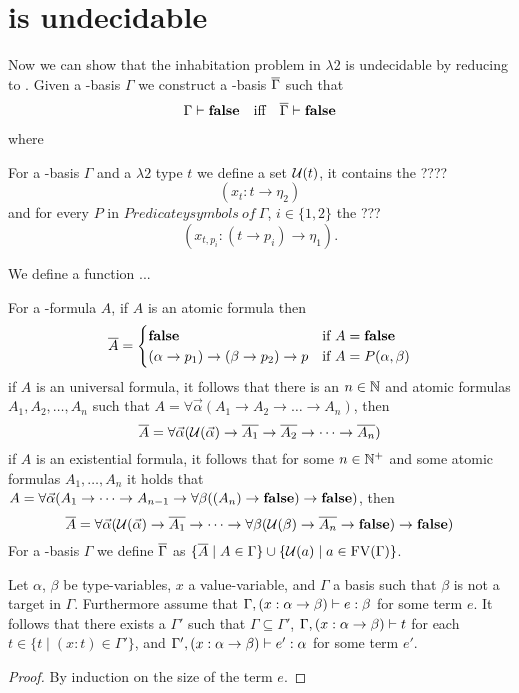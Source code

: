 \section{\lambdaInhab{} is undecidable}
Now we can show that the inhabitation problem in $\lambda2$ %
is undecidable by reducing \PCons{} to \lambdaInhab{}. Given a \SysP-basis $\Gamma$ we construct a \lambdaTwo-basis $\overline{\Gamma}$ such that 
\begin{align*}
\Gamma\vdash\textbf{false}&&\text{iff}&&\overline{\Gamma}\vdash\textbf{false}
\end{align*}
where \false{} 

\begin{definition}
For a \SysP-basis $\Gamma$ and a $\lambda2$ type $t$ we define a set $\mathcal{U}(t)$, it contains the ???? \[(x_t:t\to\eta_2)\] and for every $P$ in $Predicateysymbols~of~\Gamma$, $i\in\{1,2\}$ the ??? \[(x_{t,p_i}:(t\to p_i)\to\eta_1).\]
\end{definition}

\begin{definition}
We define a function ...

For a \SysP-formula $A$, if $A$ is an atomic formula then
\[
\trans{A}=
\begin{cases}
\false &\text{if $A=\false$}\\
(\alpha\to p_1)\to(\beta\to p_2)\to p &\text{if $A=P(\alpha,\beta)$} %
\end{cases}
\]
if $A$ is an universal formula, it follows that there is an $n\in\mathbb{N}$ and atomic formulas $A_1,A_2,\dots,A_n$ such that $A=\forall\vec{\alpha}(A_1\to A_2 \to\dots\to A_n)$, then %
\[\overline{A}=\forall\vec{\alpha}(\mathcal{U}(\vec{\alpha})\to \overline{A_1}\to \overline{A_2} \to\dots\to\overline{ A_n})\]
if $A$ is an existential formula, it follows that for some $n\in\mathbb{N}^+$ and some atomic formulas $A_1,\dots,A_n$ it holds that $A=\forall\vec{\alpha}(A_1 \to\dots\to A_{n-1}\to \forall\beta((A_n)\to\textbf{false})\to\textbf{false})$, then %
\[\overline{A}=\forall\vec{\alpha}(\mathcal{U}(\vec{\alpha})\to \overline{A_1}\to\dots\to\forall\beta(\mathcal{U}(\beta)\to\overline{ A_n}\to\textbf{false})\to\textbf{false})\]
For a \SysP-basis $\Gamma$ we define $\overline{\Gamma}$ as $\{\overline{A}\mid A\in\Gamma\}\cup\{\mathcal{U}(a)\mid a\in\text{FV}(\Gamma)\}$. %

\end{definition}

\begin{claim}
Let $\alpha$, $\beta$ be type-variables, $x$ a value-variable, and $\Gamma$ a %
basis such that $\beta$ is not a target in $\Gamma$. %
Furthermore assume that $\Gamma,(x:\alpha\to\beta)\vdash e:\beta$ for some term $e$. It follows that there exists a $\Gamma'$ such that $\Gamma\subseteq\Gamma'$, $\Gamma,(x:\alpha\to\beta)\vdash t$ for each $t\in\{t\mid (x:t)\in\Gamma'\}$, and $\Gamma',(x:\alpha\to\beta)\vdash e':\alpha$ for some term $e'$. %
\end{claim}
\begin{proof}
By induction on the size of the term $e$. %
\end{proof}